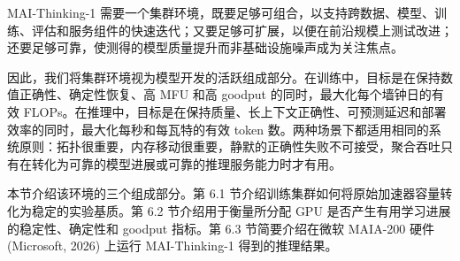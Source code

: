 MAI-Thinking-1 需要一个集群环境，既要足够可组合，以支持跨数据、模型、训练、评估和服务组件的快速迭代；又要足够可扩展，以便在前沿规模上测试改进；还要足够可靠，使测得的模型质量提升而非基础设施噪声成为关注焦点。

因此，我们将集群环境视为模型开发的活跃组成部分。在训练中，目标是在保持数值正确性、确定性恢复、高 MFU 和高 goodput 的同时，最大化每个墙钟日的有效 FLOPs。在推理中，目标是在保持质量、长上下文正确性、可预测延迟和部署效率的同时，最大化每秒和每瓦特的有效 token 数。两种场景下都适用相同的系统原则：拓扑很重要，内存移动很重要，静默的正确性失败不可接受，聚合吞吐只有在转化为可靠的模型进展或可靠的推理服务能力时才有用。

本节介绍该环境的三个组成部分。第 6.1 节介绍训练集群如何将原始加速器容量转化为稳定的实验基质。第 6.2 节介绍用于衡量所分配 GPU 是否产生有用学习进展的稳定性、确定性和 goodput 指标。第 6.3 节简要介绍在微软 MAIA-200 硬件 (Microsoft, 2026) 上运行 MAI-Thinking-1 得到的推理结果。

